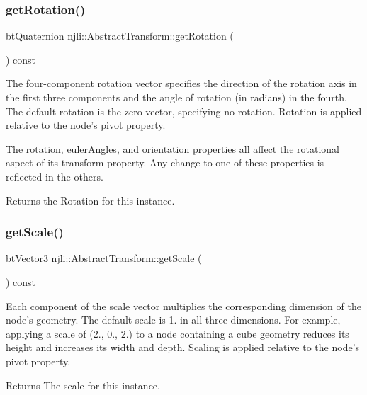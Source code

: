 \subsubsection{\texorpdfstring{get\+Rotation()}{getRotation()}}
{\footnotesize\ttfamily bt\+Quaternion njli\+::\+Abstract\+Transform\+::get\+Rotation (\begin{DoxyParamCaption}{ }\end{DoxyParamCaption}) const}

The four-\/component rotation vector specifies the direction of the rotation axis in the first three components and the angle of rotation (in radians) in the fourth. The default rotation is the zero vector, specifying no rotation. Rotation is applied relative to the node’s pivot property.

The rotation, euler\+Angles, and orientation properties all affect the rotational aspect of its transform property. Any change to one of these properties is reflected in the others.

\begin{DoxyReturn}{Returns}
the Rotation for this instance. 
\end{DoxyReturn}
\mbox{\label{classnjli_1_1_abstract_transform_a292f90f311e9af8e2bffc630b100ca2b}} 
\subsubsection{\texorpdfstring{get\+Scale()}{getScale()}}
{\footnotesize\ttfamily bt\+Vector3 njli\+::\+Abstract\+Transform\+::get\+Scale (\begin{DoxyParamCaption}{ }\end{DoxyParamCaption}) const}

Each component of the scale vector multiplies the corresponding dimension of the node’s geometry. The default scale is 1. in all three dimensions. For example, applying a scale of (2., 0., 2.) to a node containing a cube geometry reduces its height and increases its width and depth. Scaling is applied relative to the node’s pivot property.

\begin{DoxyReturn}{Returns}
The scale for this instance. 
\end{DoxyReturn}
\mbox{\label{classnjli_1_1_abstract_transform_a6341254e626b209df85d0b7e830c2894}} 
